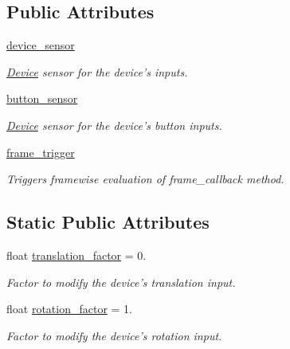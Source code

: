 \subsection*{\-Public \-Attributes}
\begin{DoxyCompactItemize}
\item 
\hyperlink{classlib_1_1Device_1_1OldSpheronDevice_a68dcdc6d331895c294990cb3e5023a54}{device\-\_\-sensor}
\begin{DoxyCompactList}\small\item\em \hyperlink{namespacelib_1_1Device}{\-Device} sensor for the device's inputs. \end{DoxyCompactList}\item 
\hyperlink{classlib_1_1Device_1_1OldSpheronDevice_a28e856c40978fd59ea474fe80424fca3}{button\-\_\-sensor}
\begin{DoxyCompactList}\small\item\em \hyperlink{namespacelib_1_1Device}{\-Device} sensor for the device's button inputs. \end{DoxyCompactList}\item 
\hyperlink{classlib_1_1Device_1_1OldSpheronDevice_ad875e2d7a7a00065947fd6367a9228ef}{frame\-\_\-trigger}
\begin{DoxyCompactList}\small\item\em \-Triggers framewise evaluation of frame\-\_\-callback method. \end{DoxyCompactList}\end{DoxyCompactItemize}
\subsection*{\-Static \-Public \-Attributes}
\begin{DoxyCompactItemize}
\item 
float \hyperlink{classlib_1_1Device_1_1OldSpheronDevice_a9cfb9fb037b8aaa46875766b80cdc6a6}{translation\-\_\-factor} = 0.
\begin{DoxyCompactList}\small\item\em \-Factor to modify the device's translation input. \end{DoxyCompactList}\item 
float \hyperlink{classlib_1_1Device_1_1OldSpheronDevice_a76924c896cd3b56a82d6089b89eb406d}{rotation\-\_\-factor} = 1.
\begin{DoxyCompactList}\small\item\em \-Factor to modify the device's rotation input. \end{DoxyCompactList}\end{DoxyCompactItemize}


